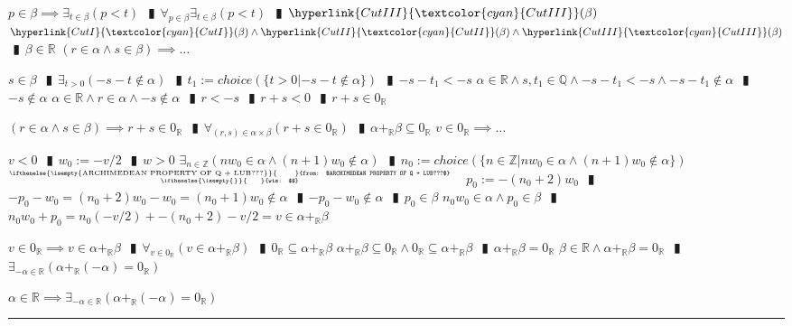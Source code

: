 \documentclass{book}
\newcommand{\rf}[1]{\hyperlink{#1}{\textcolor{cyan}{#1}}}
\newcommand{\abr}{:=}
\newcommand{\pipe}{$\phantom{(}\vrectangleblack\phantom{)}$}
\newcommand{\pr}[1]{\left(#1\right)}
\newcommand{\ann}[2]{%
  \hfill %
  $\stackrel%
  {\hbox{\tiny{\ifthenelse{\isempty{#1}}%
    {\phantom{from}}%
    {from: $#1$}}}}%
  {\hbox{\tiny{\ifthenelse{\isempty{#2}}%
    {\phantom{wts}}%
    {wts: $#2$}}}}$%
\ }
\begin{document}
\begin{enumerate}
\begin{enumerate}
\begin{enumerate}
    \end{enumerate}
    \lit $p \in \beta \implies \exists_{t \in \beta}(p < t)$ \pipe $\forall_{p \in \beta} \exists_{t \in \beta}(p < t)$ \pipe $\rf{CutIII}(\beta)$
    \lit $\rf{CutI}(\beta) \land \rf{CutII}(\beta) \land \rf{CutIII}(\beta)$ \pipe $\beta \in \mathbb{R}$
    \lit $(r \in \alpha \land s \in \beta) \implies \ldots$
    \begin{enumerate}
      \lit $s \in \beta$ \pipe $\exists_{t > 0}(-s - t \notin \alpha)$ \pipe $t_1 \abr choice(\{t > 0 | -s - t \notin \alpha\})$ \pipe $-s - t_1 < -s$
      \lit $\alpha \in \mathbb{R} \land s, t_1 \in \mathbb{Q} \land -s - t_1 < -s \land -s - t_1 \notin \alpha$ \pipe $-s \notin \alpha$
      \lit $\alpha \in \mathbb{R} \land r \in \alpha \land -s \notin \alpha$ \pipe $r < -s$ \pipe $r + s < 0$ \pipe $r + s \in 0_{\mathbb{R}}$
    \end{enumerate}
    \lit $(r \in \alpha \land s \in \beta) \implies r + s \in 0_\mathbb{R}$ \pipe $\forall_{(r, s) \in \alpha \times \beta}(r + s \in 0_{\mathbb{R}})$ \pipe $\alpha +_{\mathbb{R}} \beta \subseteq 0_{\mathbb{R}}$
    \lit $v \in 0_{\mathbb{R}} \implies \ldots$
    \begin{enumerate}
      \lit $v < 0$ \pipe $w_0 \abr -v/2$ \pipe $w > 0$
      \lit $\exists_{n \in \mathbb{Z}}(n w_0 \in \alpha \land (n + 1) w_0 \notin \alpha)$ \pipe $n_0 \abr choice(\{n \in \mathbb{Z} | n w_0 \in \alpha \land (n + 1) w_0 \notin \alpha\})$    \ann{ARCHIMEDEAN PROPERTY OF Q + LUB???}{}
      \lit $p_0 \abr -(n_0 + 2) w_0$ \pipe $-p_0 - w_0 = (n_0 + 2) w_0 - w_0 = (n_0 + 1) w_0 \notin \alpha$ \pipe $-p_0 - w_0 \notin \alpha$ \pipe $p_0 \in \beta$
      \lit $n_0 w_0 \in \alpha \land p_0 \in \beta$ \pipe $n_0 w_0 + p_0 = n_0 (-v/2) + -(n_0 + 2) -v/2 = v \in \alpha +_{\mathbb{R}} \beta$
    \end{enumerate}      
    \lit $v \in 0_{\mathbb{R}} \implies v \in \alpha +_{\mathbb{R}} \beta$ \pipe $\forall _{v \in 0_{\mathbb{R}}}(v \in \alpha +_{\mathbb{R}} \beta)$ \pipe $0_{\mathbb{R}} \subseteq \alpha +_{\mathbb{R}} \beta$
    \lit $\alpha +_{\mathbb{R}} \beta \subseteq 0_{\mathbb{R}} \land 0_{\mathbb{R}} \subseteq \alpha +_{\mathbb{R}} \beta$ \pipe $\alpha +_{\mathbb{R}} \beta = 0_{\mathbb{R}}$ 
    \lit $\beta \in \mathbb{R} \land \alpha +_{\mathbb{R}} \beta = 0_{\mathbb{R}}$ \pipe $\exists_{-\alpha \in \mathbb{R}}(\alpha +_{\mathbb{R}} (-\alpha) = 0_{\mathbb{R}})$
  \end{enumerate}
  \lit $\alpha \in \mathbb{R} \implies \exists_{-\alpha \in \mathbb{R}}\pr{\alpha +_{\mathbb{R}} (-\alpha) = 0_{\mathbb{R}}}$
\end{enumerate} \vspace{.75mm} \hrule \vspace{.75mm} \ \\
\end{document}
